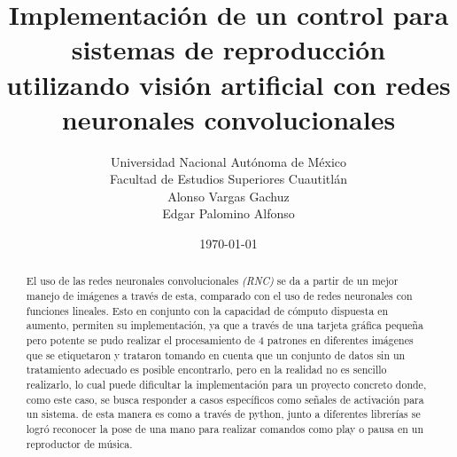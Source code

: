 \documentclass[a4paper, 12pt]{article}
\title{Implementación de un control para sistemas de reproducción utilizando visión artificial con redes neuronales convolucionales}
\author{		
    Universidad Nacional Autónoma de México\\
    Facultad de Estudios Superiores Cuautitlán\\
    Alonso Vargas Gachuz\\
    Edgar Palomino Alfonso
}
\date{\today}
\begin{document}
    \maketitle 
    \begin{abstract}      
        El uso de las redes neuronales convolucionales \emph{(RNC)} se da a partir de un mejor manejo de imágenes a través de esta, comparado con el uso de redes neuronales con funciones lineales. Esto en conjunto con la capacidad de cómputo dispuesta en aumento, permiten su implementación, ya que a través de una tarjeta gráfica pequeña pero potente se pudo realizar el procesamiento de 4 patrones en diferentes imágenes que se etiquetaron y trataron tomando en cuenta que un conjunto de datos sin un tratamiento adecuado es posible encontrarlo, pero en la realidad no es sencillo realizarlo, lo cual puede dificultar la implementación para un proyecto concreto donde, como este caso, se busca responder a casos específicos como señales de activación para un sistema. de esta manera es como a través de python, junto a diferentes librerías se logró reconocer la pose de una mano para realizar comandos como play o pausa en un reproductor de música.
    \end{abstract} 
    \vspace{2ex}
\end{document}
